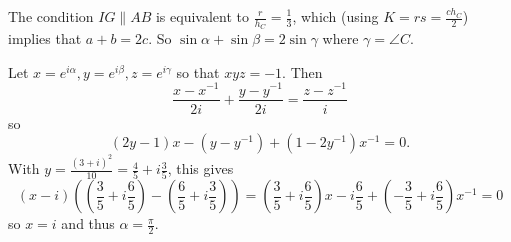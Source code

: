 The condition $IG\parallel AB$ is equivalent to $\frac{r}{h_C}=\frac{1}{3}$, which (using $K=rs=\frac{ch_C}{2}$) implies that $a+b=2c$. So $\sin\alpha+\sin\beta=2\sin\gamma$ where $\gamma=\angle{C}$.

Let $x=e^{i\alpha},y=e^{i\beta},z=e^{i\gamma}$ so that $xyz=-1$. Then
\[
	\frac{x-x^{-1}}{2i}+\frac{y-y^{-1}}{2i}=\frac{z-z^{-1}}{i}
\]
so
\[
	(2y-1)x-(y-y^{-1})+(1-2y^{-1})x^{-1}=0.
\]
With $y=\frac{(3+i)^2}{10}=\frac{4}{5}+i\frac{3}{5}$, this gives
\[
	\left(x-i\right)\left(\left(\frac{3}{5}+i\frac{6}{5}\right)-\left(\frac{6}{5}+i\frac{3}{5}\right)\right)=\left(\frac{3}{5}+i\frac{6}{5}\right)x-i\frac{6}{5}+\left(-\frac{3}{5}+i\frac{6}{5}\right)x^{-1}=0
\]
so $x=i$ and thus $\alpha=\boxed{\frac{\pi}{2}}$.